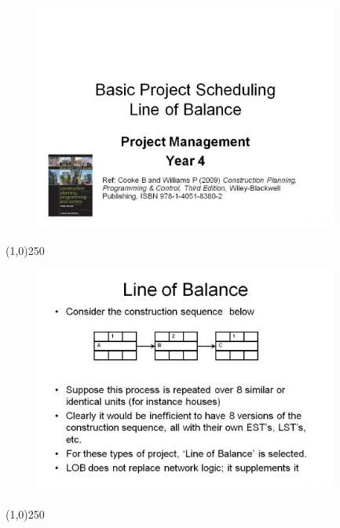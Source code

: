 \begin{frame}
\begin{figure}
	\centering
		\includegraphics[width = 10.0cm]{oldnotes/Slide242.jpg}
\end{figure}
\end{frame}
\begin{center}\line(1,0){250}\end{center}





\begin{frame}
\begin{figure}
	\centering
		\includegraphics[width = 10.0cm]{oldnotes/Slide243.jpg}
\end{figure}
\end{frame}
\begin{center}\line(1,0){250}\end{center}






